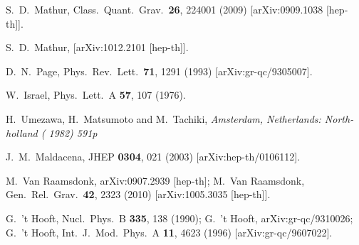 \documentclass[11pt]{article}
\begin{document}
\begin{thebibliography}{10}
  S.~D.~Mathur,
  Class.\ Quant.\ Grav.\  {\bf 26}, 224001 (2009)
  [arXiv:0909.1038 [hep-th]].

  S.~D.~Mathur,
   [arXiv:1012.2101 [hep-th]].


  D.~N.~Page,
  Phys.\ Rev.\ Lett.\  {\bf 71}, 1291 (1993)
  [arXiv:gr-qc/9305007].
  
  
  W.~Israel,
  Phys.\ Lett.\  A {\bf 57}, 107 (1976).

  H.~Umezawa, H.~Matsumoto and M.~Tachiki,
{\it  Amsterdam, Netherlands: North-holland ( 1982) 591p}

  J.~M.~Maldacena,
  JHEP {\bf 0304}, 021 (2003)
  [arXiv:hep-th/0106112].

  M.~Van Raamsdonk,
  arXiv:0907.2939 [hep-th];
  M.~Van Raamsdonk,
  Gen.\ Rel.\ Grav.\  {\bf 42}, 2323 (2010)
  [arXiv:1005.3035 [hep-th]].











G.~'t Hooft,
  Nucl.\ Phys.\  B {\bf 335}, 138 (1990);
 G.~'t Hooft,
  arXiv:gr-qc/9310026;
  G.~'t Hooft,
  Int.\ J.\ Mod.\ Phys.\  A {\bf 11}, 4623 (1996)
  [arXiv:gr-qc/9607022].


\end{thebibliography}
\end{document}

